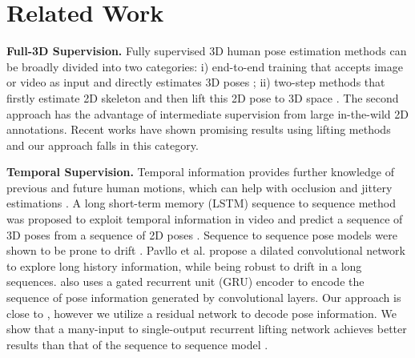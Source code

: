 \documentclass[10pt,twocolumn,letterpaper]{article}
\begin{document}
\section{Related Work}
\textbf{Full-3D Supervision.}
Fully supervised 3D human pose estimation methods can be broadly divided into two categories: i) end-to-end training that accepts image or video as input and directly estimates 3D poses \cite{Tome_2017_CVPR, 10.1007/978-3-319-49409-8_15, Xu_2020_CVPR, Sun_2018_ECCV,Li_2020_CVPR}; ii) two-step methods that firstly estimate 2D skeleton and then lift this 2D pose to 3D space \cite{Chen_2017_CVPR, mehta2020xnect, Pavlakos_2018_CVPR,Pavllo_2019_CVPR, Tekin_2017_ICCV}. The second approach has the advantage of intermediate supervision from large in-the-wild 2D annotations. Recent works have shown promising results using lifting methods \cite{Martinez_2017_ICCV, Pavllo_2019_CVPR} and our approach falls in this category. 

\textbf{Temporal Supervision.}
Temporal information provides further knowledge of previous and future human motions, which can help with occlusion and jittery estimations \cite{Arnab_2019_CVPR, Pavllo_2019_CVPR, Cheng_2019_ICCV, Hossain_2018_ECCV, Kocabas_2020_CVPR, Cheng_2019_ICCV, Kanazawa_2019_CVPR}. A long short-term memory (LSTM) sequence to sequence method was proposed to exploit temporal information in video and predict a sequence of 3D poses from a sequence of 2D poses \cite{Hossain_2018_ECCV}. Sequence to sequence pose models were shown to be prone to drift \cite{Pavllo_2019_CVPR}. Pavllo et al. \cite{Pavllo_2019_CVPR} propose a dilated convolutional network to explore long history information, while being robust to drift in a long sequences. \cite{Kocabas_2020_CVPR} also uses a gated recurrent unit (GRU) encoder to encode the sequence of pose information generated by convolutional layers. Our approach is close to \cite{Kocabas_2020_CVPR}, however we utilize a residual network \cite{Martinez_2017_ICCV} to decode pose information. We show that a many-input to single-output recurrent lifting network achieves better results than that of the sequence to sequence model \cite{Hossain_2018_ECCV}. 
\end{document}
